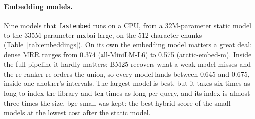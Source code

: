 \documentclass[11pt,a4paper]{article}
\newcommand{\code}[1]{\texttt{#1}}
\begin{document}
\paragraph{Embedding models.} Nine models that \code{fastembed} runs on a CPU, from a 32M-parameter static
model to the 335M-parameter mxbai-large, on the 512-character chunks (Table~\ref{tab:embeddings}). On its
own the embedding model matters a great deal: dense MRR ranges from 0.374 (all-MiniLM-L6) to 0.575
(arctic-embed-m). Inside the full pipeline it hardly matters: BM25 recovers what a weak model misses and the
re-ranker re-orders the union, so every model lands between 0.645 and 0.675, inside one another's
intervals. The largest model is best, but it takes six times as long to index the library and ten times as
long per query, and its index is almost three times the size. bge-small was kept: the best hybrid score of
the small models at the lowest cost after the static model.

\begin{table}[htbp]\centering\small
{}
\caption{Embedding models (sentence-512 chunks). \emph{Index time} embeds all 1,661 passages; \emph{Query ms}
is dense search including embedding the question.}\label{tab:embeddings}
\end{table}
\end{document}

